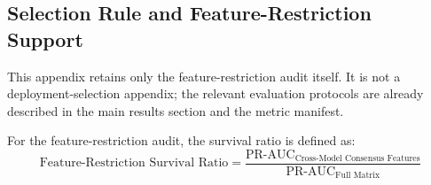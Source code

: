 \documentclass[11pt, letterpaper]{article}
\begin{document}
\newpage
\subsection{Selection Rule and Feature-Restriction Support}
\label{app:quant_selection_support}

\noindent This appendix retains only the feature-restriction audit itself. It is not a deployment-selection appendix; the relevant evaluation protocols are already described in the main results section and the metric manifest.

\noindent For the feature-restriction audit, the survival ratio is defined as:
\begin{equation}
    \text{Feature-Restriction Survival Ratio} = \frac{\text{PR-AUC}_{\text{Cross-Model Consensus Features}}}{\text{PR-AUC}_{\text{Full Matrix}}}
\end{equation}

\begin{table}[H]
    \centering
    \renewcommand{\arraystretch}{1.2}
    \caption[Feature-Restriction Survival Ratio Matrix]{Feature-restriction survival ratios across all architectures. Models were restricted to a cross-model consensus feature set (Demographics, Housing Tenure, and Neighborhood Income). Survival Ratio is defined as Restricted PR-AUC / Full Matrix PR-AUC. Percent Change is computed as $(\text{Ratio}-1)\times100$.}
    \label{tab:spuriousness_index}
\end{table}
\end{document}

